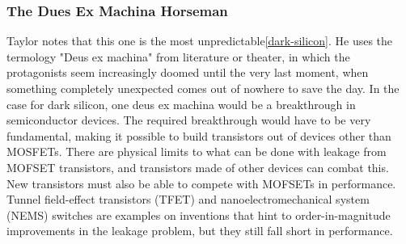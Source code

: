 
\subsubsection{The Dues Ex Machina Horseman}
Taylor notes that this one is the most unpredictable\ref{dark-silicon}.
He uses the termology "Deus ex machina" from literature or theater, in which the protagonists seem increasingly doomed until the very last moment, when something completely unexpected comes out of nowhere to save the day.
In the case for dark silicon, one deus ex machina would be a breakthrough in semiconductor devices.
The required breakthrough would have to be very fundamental, making it possible to build transistors out of devices other than MOSFETs. 
There are physical limits to what can be done with leakage from MOFSET transistors, and transistors made of other devices can combat this.
New transistors must also be able to compete with MOFSETs in performance.
Tunnel field-effect transistors (TFET) and nanoelectromechanical system (NEMS) switches are examples on inventions that hint to order-in-magnitude improvements in the leakage problem, but they still fall short in performance.

